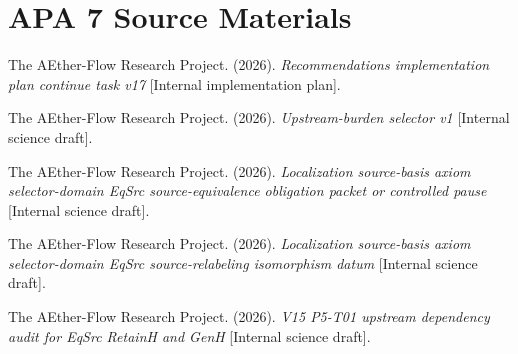 \documentclass[11pt]{article}
\begin{document}
\section*{APA 7 Source Materials}

The AEther-Flow Research Project. (2026). \emph{Recommendations implementation
plan continue task v17} [Internal implementation plan].

The AEther-Flow Research Project. (2026). \emph{Upstream-burden selector v1}
[Internal science draft].

The AEther-Flow Research Project. (2026). \emph{Localization source-basis
axiom selector-domain EqSrc source-equivalence obligation packet or controlled
pause} [Internal science draft].

The AEther-Flow Research Project. (2026). \emph{Localization source-basis
axiom selector-domain EqSrc source-relabeling isomorphism datum} [Internal
science draft].

The AEther-Flow Research Project. (2026). \emph{V15 P5-T01 upstream dependency
audit for EqSrc RetainH and GenH} [Internal science draft].
\end{document}
